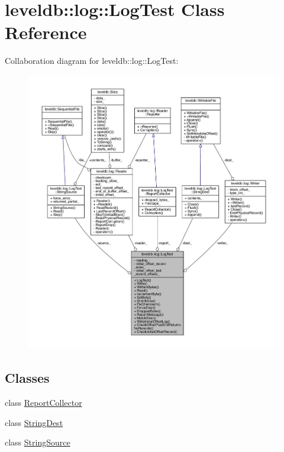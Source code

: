 \hypertarget{classleveldb_1_1log_1_1_log_test}{}\section{leveldb\+:\+:log\+:\+:Log\+Test Class Reference}
\label{classleveldb_1_1log_1_1_log_test}


Collaboration diagram for leveldb\+:\+:log\+:\+:Log\+Test\+:\nopagebreak
\begin{figure}[H]
\begin{center}
\leavevmode
\includegraphics[width=350pt]{classleveldb_1_1log_1_1_log_test__coll__graph}
\end{center}
\end{figure}
\subsection*{Classes}
\begin{DoxyCompactItemize}
\item 
class \hyperlink{classleveldb_1_1log_1_1_log_test_1_1_report_collector}{Report\+Collector}
\item 
class \hyperlink{classleveldb_1_1log_1_1_log_test_1_1_string_dest}{String\+Dest}
\item 
class \hyperlink{classleveldb_1_1log_1_1_log_test_1_1_string_source}{String\+Source}
\end{DoxyCompactItemize}

